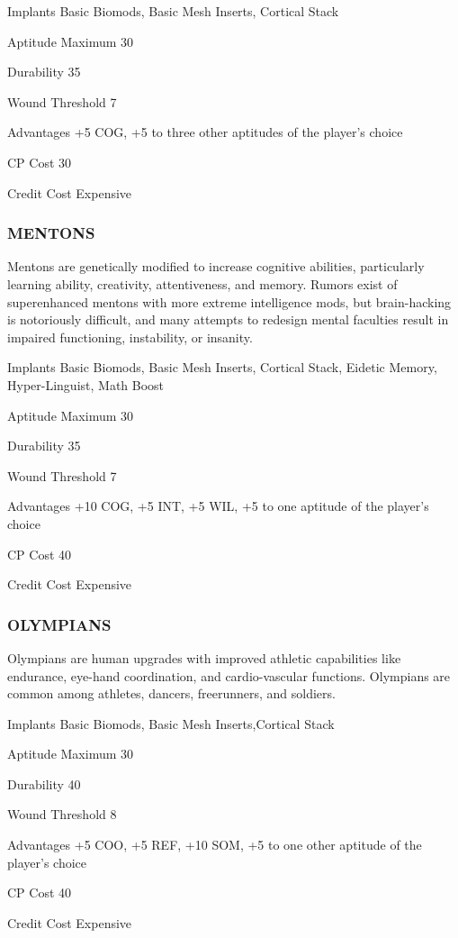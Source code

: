 \begin{description*}
\item[Implants]  Basic Biomods, Basic Mesh Inserts, Cortical Stack
\item[Aptitude Maximum]  30 
\item[Durability]  35 
\item[Wound Threshold]  7 
\item[Advantages]  +5 COG, +5 to three other aptitudes of the player’s choice 
\item[CP Cost]  30 
\item[Credit Cost]  Expensive
\end{description*}

\subsubsection{MENTONS}
Mentons are genetically modified to increase cognitive abilities,
particularly learning ability, creativity, attentiveness, and memory. Rumors
exist of superenhanced mentons with more extreme intelligence mods, but
brain-hacking is notoriously difficult, and many attempts to redesign mental
faculties result in impaired functioning, instability, or insanity.

\begin{description*}
\item[Implants] Basic Biomods, Basic Mesh Inserts, Cortical Stack, Eidetic
  Memory, Hyper-Linguist, Math Boost
\item[Aptitude Maximum]  30 
\item[Durability]  35 
\item[Wound Threshold]  7 
\item[Advantages] +10 COG, +5 INT, +5 WIL, +5 to one aptitude of the player’s
  choice
\item[CP Cost]  40 
\item[Credit Cost]  Expensive
\end{description*}

\subsubsection{OLYMPIANS}
Olympians are human upgrades with improved athletic capabilities like
endurance, eye-hand coordination, and cardio-vascular functions. Olympians
are common among athletes, dancers, freerunners, and soldiers.

\begin{description*}
\item[Implants] Basic Biomods, Basic Mesh Inserts,Cortical Stack 
\item[Aptitude Maximum] 30 
\item[Durability] 40 
\item[Wound Threshold] 8 
\item[Advantages] +5 COO, +5 REF, +10 SOM, +5 to one other aptitude of the
  player’s choice
\item[CP Cost] 40 
\item[Credit Cost] Expensive 
\end{description*}

